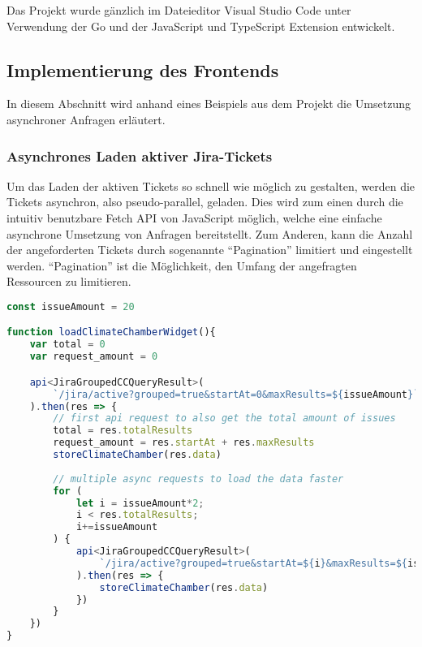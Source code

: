 \newpage

Das Projekt wurde gänzlich im Dateieditor Visual Studio Code
unter Verwendung der Go und der JavaScript und TypeScript Extension entwickelt.

\subsection{Implementierung des Frontends}
In diesem Abschnitt wird anhand eines Beispiels aus dem Projekt die Umsetzung
asynchroner Anfragen erläutert.

\subsubsection{Asynchrones Laden aktiver Jira-Tickets}
Um das Laden der aktiven Tickets so schnell wie möglich zu gestalten, werden die
Tickets asynchron, also pseudo-parallel, geladen. Dies wird zum einen durch
die intuitiv benutzbare Fetch API
von JavaScript möglich, welche eine einfache asynchrone Umsetzung von Anfragen bereitstellt.
Zum Anderen, kann die Anzahl der angeforderten Tickets durch sogenannte ``Pagination''
limitiert und eingestellt werden. ``Pagination'' ist die Möglichkeit, den Umfang 
der angefragten Ressourcen zu limitieren.

\begin{lstlisting}[caption=TypeScript Funktion zum asynchronen Laden aktiver Tickets (\textit{frontend/src/ts/dashboard.ts}),language=TypeScript]
const issueAmount = 20

function loadClimateChamberWidget(){
    var total = 0
    var request_amount = 0

    api<JiraGroupedCCQueryResult>(
        `/jira/active?grouped=true&startAt=0&maxResults=${issueAmount}`
    ).then(res => {
        // first api request to also get the total amount of issues
        total = res.totalResults
        request_amount = res.startAt + res.maxResults
        storeClimateChamber(res.data)
        
        // multiple async requests to load the data faster
        for (
            let i = issueAmount*2;
            i < res.totalResults;
            i+=issueAmount
        ) {
            api<JiraGroupedCCQueryResult>(
                `/jira/active?grouped=true&startAt=${i}&maxResults=${issueAmount}`
            ).then(res => {
                storeClimateChamber(res.data)
            })
        }
    })  
}
\end{lstlisting}

